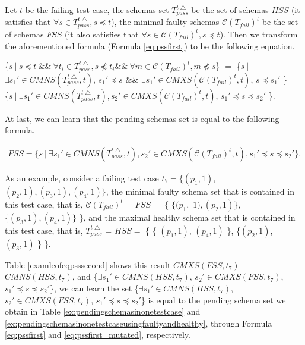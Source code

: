 {Let $t$ be the failing test case, the schemas set $T_{pass}^{t\bigtriangleup}$ be the set of schemas $HSS$ (it satisfies that $\forall s \in T_{pass}^{t\bigtriangleup}, s \preceq t $), the minimal faulty schemas $\mathcal{C}(T_{fail})^{t}$ be the set of schemas $FSS$ (it also satisfies that $\forall s \in \mathcal{C}(T_{fail})^{t}, s \preceq t $). Then we transform the aforementioned formula (Formula \ref{eq:pssfirst}) to be the following equation.

\{$s\ |\ s \preceq t\ \&\&\ \forall t_{i} \in T_{pass}^{t\bigtriangleup}, s \npreceq t_{i} \&\&\ \forall m \in \mathcal{C}(T_{fail})^{t}, m \npreceq s   $\} $=$  \{$ s\ |\ $ $\exists s_{1}' \in CMNS(T_{pass}^{t\bigtriangleup}, t)$, $s_{1}' \preceq s$  $\&\&$ $\exists s_{1}' \in CMXS(\mathcal{C}(T_{fail})^{t}, t)$, $s \preceq s_{1}'$  \} $=$  \{$ s\ |\ \exists s_{1}' \in CMNS(T_{pass}^{t\bigtriangleup}, t), s_{2}' \in CMXS(\mathcal{C}(T_{fail})^{t}, t)$, $s_{1}' \preceq s \preceq s_{2}'$ \}.

At last, we can learn that the pending schemas set is equal to the following formula.


\begin{equation}\label{eq:psssecond}
\begin{aligned}
PSS =  \{ s\ |\ \exists s_{1}' \in CMNS(T_{pass}^{t\bigtriangleup}, t), s_{2}' \in CMXS(\mathcal{C}(T_{fail})^{t}, t),  s_{1}' \preceq s \preceq s_{2}' \}.
\end{aligned}
\end{equation}


As an example, consider a failing test case $t_{7} = \{(p_{1}, 1),$ $ (p_{2}, 1), (p_{3}, 1), (p_{4}, 1)\}$, the minimal faulty schema set that is contained in this test case, that is, $\mathcal{C}(T_{fail})^{t}$ = $FSS =$ \{ $\{(p_{1}, $ $1), (p_{2}, 1)\}$, $\{(p_{3}, 1), (p_{4}, 1)\}$ \}, and the maximal healthy schema set that is contained in this test case, that is,  $T_{pass}^{t\bigtriangleup}$ = $HSS =$  \{ \{ $(p_{1}, 1)$, $(p_{4}, 1)$ \}, \{$(p_{2}, 1)$, $(p_{3}, 1)$ \} \}.


Table \ref{examleofeqpsssecond} shows this result $CMXS(FSS, t_{7})$ $CMNS(HSS, t_{7})$, and \{$\exists s_{1}' \in CMNS(HSS, t_{7})$, $s_{2}' \in CMXS(FSS, t_{7})$, $s_{1}' \preceq s \preceq s_{2}'$\}, we can learn the set \{$\exists s_{1}' \in CMNS(HSS, t_{7})$, $s_{2}' \in CMXS(FSS, t_{7})$, $s_{1}' \preceq s \preceq s_{2}'$\} is equal to the pending schema set we obtain in Table \ref{ex:pendingschemasinonetestcase} and \ref{ex:pendingschemasinonetestcaseusingfaultyandhealthy}, through Formula \ref{eq:pssfirst} and \ref{eq:pssfirst_mutated}, respectively.


}
